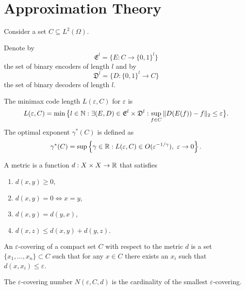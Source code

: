 \newpage
\section{Approximation Theory}

Consider a set $C\subseteq L^2(\Omega)$. 

\begin{boxdefinition}[]
    Denote by 
    $$
    \mathfrak{E}^l=\{E\colon C\to\{0,1\}^l\}
    $$
    the set of binary encoders of length $l$
    and by 
    $$
    \mathfrak{D}^l=\{D\colon \{0,1\}^l\to C\}
    $$
    the set of binary decoders of length $l$.
\end{boxdefinition}

\begin{boxdefinition}
    The minimax code length $L(\varepsilon,C)$ for 
    $\varepsilon$ is 
    $$
    L(\varepsilon,C)=\min\big\lbrace l\in\mathbb{N}:\exists (E,D)\in
    \mathfrak{E}^l\times\mathfrak{D}^l:
    \sup_{f\in C}\|D(E(f)) -f \|_2\leq\varepsilon\big\rbrace.$$
    The optimal exponent $\gamma^*(C)$ is defined as
    $$
    \gamma^*(C)=\sup\left\lbrace
    \gamma\in\mathbb{R}:L(\varepsilon,C)\in
    O(\varepsilon^{-1/\gamma}),\ \varepsilon\to 0
    \right\rbrace.$$
\end{boxdefinition}

\begin{boxdefinition}[]
    A metric is a function $d: X\times X\to\mathbb{R}$ that
    satisfies
    \begin{enumerate}
        \item $d(x,y)\geq 0$,
        \item $d(x,y)=0 \Leftrightarrow x=y$,
        \item $d(x,y)=d(y,x)$,
        \item $d(x,z)\leq d(x,y)+d(y,z)$.
    \end{enumerate}
\end{boxdefinition}

\begin{boxdefinition}
    An $\varepsilon$-covering of a compact set $C$
    with respect to the metric $d$ is a set
    $\{x_1,\dots,x_n\}\subset C$ such that for any
    $x\in C$ there exists an $x_i$ such that 
    $d(x,x_i)\leq \varepsilon$. 
\end{boxdefinition}

\begin{boxdefinition}
    The $\varepsilon$-covering number 
    $N(\varepsilon, C,d)$ is the cardinality of 
    the smallest $\varepsilon$-covering.
\end{boxdefinition}


